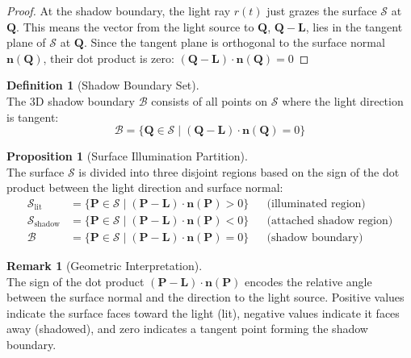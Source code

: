 \documentclass[12pt,a4paper]{article}
\theoremstyle{definition}
\newtheorem{definition}{Definition}[subsection]
\newtheorem{proposition}{Proposition}[subsection]
\newtheorem{remark}{Remark}[subsection]
\newcommand{\vect}[1]{\bm{#1}}
\begin{document}
\begin{proof}
At the shadow boundary, the light ray \(r(t)\) just grazes the surface \(\mathcal{S}\) at \(\vect{Q}\). This means the vector from the light source to \(\vect{Q}\), \(\vect{Q} - \vect{L}\), lies in the tangent plane of \(\mathcal{S}\) at \(\vect{Q}\). Since the tangent plane is orthogonal to the surface normal \(\vect{n}(\vect{Q})\), their dot product is zero: $(\vect{Q} - \vect{L}) \cdot \vect{n}(\vect{Q}) = 0$
\end{proof}

\begin{definition}[Shadow Boundary Set] \label{def:boundary_set} ~\\
The 3D shadow boundary \(\mathcal{B}\) consists of all points on \(\mathcal{S}\) where the light direction is tangent:
\begin{equation}
\boxed{\mathcal{B} = \{\vect{Q} \in \mathcal{S} \mid (\vect{Q} - \vect{L}) \cdot \vect{n}(\vect{Q}) = 0\}} \label{eq:boundary_set}
\end{equation}
\end{definition}

\begin{proposition}[Surface Illumination Partition] \label{prop:illumination_partition} ~\\
The surface \(\mathcal{S}\) is divided into three disjoint regions based on the sign of the dot product between the light direction and surface normal:
\begin{align}
\mathcal{S}_{\text{lit}} &= \{\vect{P} \in \mathcal{S} \mid (\vect{P} - \vect{L}) \cdot \vect{n}(\vect{P}) > 0\} && \text{(illuminated region)} \label{eq:lit_region} \\
\mathcal{S}_{\text{shadow}} &= \{\vect{P} \in \mathcal{S} \mid (\vect{P} - \vect{L}) \cdot \vect{n}(\vect{P}) < 0\} && \text{(attached shadow region)} \label{eq:shadow_region} \\
\mathcal{B} &= \{\vect{P} \in \mathcal{S} \mid (\vect{P} - \vect{L}) \cdot \vect{n}(\vect{P}) = 0\} && \text{(shadow boundary)} \label{eq:boundary_region}
\end{align}
\end{proposition}

\begin{remark}[Geometric Interpretation] \label{rmk:illum_sign} ~\\
The sign of the dot product \((\vect{P} - \vect{L}) \cdot \vect{n}(\vect{P})\) encodes the relative angle between the surface normal and the direction to the light source. Positive values indicate the surface faces toward the light (lit), negative values indicate it faces away (shadowed), and zero indicates a tangent point forming the shadow boundary.
\end{remark}
\end{document}
